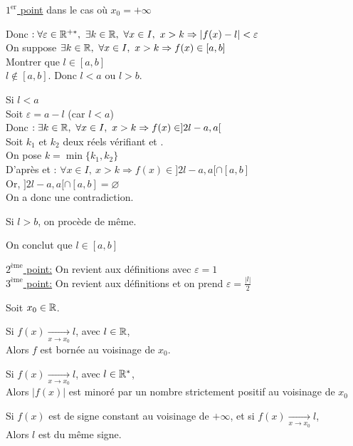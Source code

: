 \documentclass[12pt,twoside,a4paper]{article}
\begin{document}
		\begin{preuve}
			\begin{flushleft}
				\underline{$1^{\text{er}}$ point} dans le cas o\`u $x_0=+\infty$
				\begin{tab}
					Donc $:\forall \varepsilon\in\R^{+*},\ \exists k\in\R,\ \forall x\in I,\ x>k\Rightarrow \left| f(x)-l \right| <\varepsilon$\\
					On suppose $\exists k\in\R,\ \forall x\in I,\ x>k\Rightarrow f(x)\in[a,b]$\\
					Montrer que $l\in[a,b]$\\
					 $l\notin [a,b]$. Donc $l<a$ ou $l>b$.
					\begin{liste}
						\item Si $l<a$\\
							Soit $\varepsilon=a-l$ (car $l<a$)\\
							Donc $:\exists k\in\R,\ \forall x\in I,\ x>k\Rightarrow f(x)\in ]2l-a,a[$\\
							Soit $k_1$ et $k_2$ deux réels vérifiant  et .\\
							On pose $k=\min\{k_1,k_2\}$\\
							D'apr\`es  et : $\forall x\in I,\ x>k\Rightarrow f(x)\in ]2l-a,a[\cap[a,b]$\\
							Or, $]2l-a,a[\cap[a,b]=\varnothing$\\
							On a donc une contradiction.
						\item Si $l>b$, on proc\`ede de m\^eme.
					\end{liste}
					On conclut que $l\in[a,b]$
				\end{tab}
				\underline{$2^{\text{\`eme}}$ point:} On revient aux définitions avec $\varepsilon=1$\\
				\underline{$3^{\text{\`eme}}$ point:} On revient aux définitions et on prend $\varepsilon=\frac{|l|}{2}$
			\end{flushleft}
		\end{preuve}
		\begin{prop}
			Soit $x_0\in \mathbb{R}$.
			\begin{liste}
				\item Si $f(x)\mathop{\longrightarrow}\limits_{x\rightarrow x_0}l$, avec $l\in\mathbb{R}$,\\
					Alors $f$ est bornée au voisinage de $x_0$.
				\item Si $f(x)\mathop{\longrightarrow}\limits_{x\rightarrow x_0} l$, avec $l\in\mathbb{R}^{*}$,\\
					Alors $|f(x)|$ est minoré par un nombre strictement positif au voisinage de $x_0$
				\item Si $f(x)$ est de signe constant au voisinage de $+\infty$, et si $f(x)\mathop{\longrightarrow}\limits_{x\rightarrow x_0}l$,\\
					Alors $l$ est du m\^eme signe.
			\end{liste}
		\end{prop}
\end{document}
